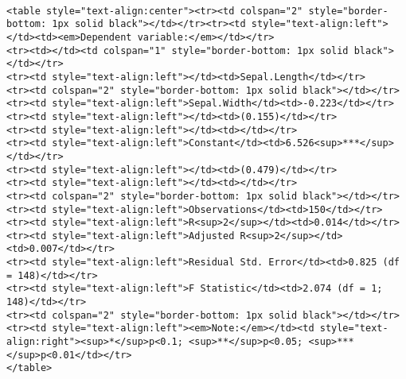 \documentclass[
  letterpaper,
  DIV=11,
  numbers=noendperiod]{scrartcl}
\begin{document}
\begin{verbatim}

<table style="text-align:center"><tr><td colspan="2" style="border-bottom: 1px solid black"></td></tr><tr><td style="text-align:left"></td><td><em>Dependent variable:</em></td></tr>
<tr><td></td><td colspan="1" style="border-bottom: 1px solid black"></td></tr>
<tr><td style="text-align:left"></td><td>Sepal.Length</td></tr>
<tr><td colspan="2" style="border-bottom: 1px solid black"></td></tr><tr><td style="text-align:left">Sepal.Width</td><td>-0.223</td></tr>
<tr><td style="text-align:left"></td><td>(0.155)</td></tr>
<tr><td style="text-align:left"></td><td></td></tr>
<tr><td style="text-align:left">Constant</td><td>6.526<sup>***</sup></td></tr>
<tr><td style="text-align:left"></td><td>(0.479)</td></tr>
<tr><td style="text-align:left"></td><td></td></tr>
<tr><td colspan="2" style="border-bottom: 1px solid black"></td></tr><tr><td style="text-align:left">Observations</td><td>150</td></tr>
<tr><td style="text-align:left">R<sup>2</sup></td><td>0.014</td></tr>
<tr><td style="text-align:left">Adjusted R<sup>2</sup></td><td>0.007</td></tr>
<tr><td style="text-align:left">Residual Std. Error</td><td>0.825 (df = 148)</td></tr>
<tr><td style="text-align:left">F Statistic</td><td>2.074 (df = 1; 148)</td></tr>
<tr><td colspan="2" style="border-bottom: 1px solid black"></td></tr><tr><td style="text-align:left"><em>Note:</em></td><td style="text-align:right"><sup>*</sup>p<0.1; <sup>**</sup>p<0.05; <sup>***</sup>p<0.01</td></tr>
</table>
\end{verbatim}
\end{document}
